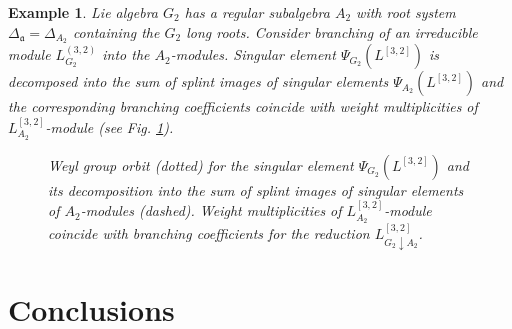 \documentclass[12pt]{article}
\newtheorem{example}{Example}[section]
\begin{document}
\vspace{10mm}
\begin{example}
   Lie algebra $G_{2}$ has a regular subalgebra $A_{2}$ with root system $\Delta_{\mathfrak{a}}=\Delta_{A_{2}}$ containing the $G_{2}$ long roots. Consider branching of an irreducible module $L_{G_{2}}^{(3,2)}$ into the $A_{2}$-modules. Singular element $\Psi_{G_{2}}(L^{[3,2]})$ is decomposed into the sum of splint images of singular elements $\Psi_{A_{2}}(L^{[3,2]})$ and the corresponding branching coefficients coincide with weight multiplicities of $L^{[3,2]}_{A_{2}}$-module (see Fig. \ref{fig:g2_splint}).


  \begin{figure}[h!bt]
  \noindent{}

  \caption{Weyl group orbit (dotted) for the singular element $\Psi_{G_{2}}(L^{[3,2]})$ and its decomposition into the sum of splint images of singular elements of $A_{2}$-modules (dashed). Weight multiplicities of $L^{[3,2]}_{A_{2}}$-module coincide with branching coefficients for the reduction $L^{[3,2]}_{G_{2}\downarrow A_{2}}$.}


 \label{fig:g2_splint}
\end{figure}

\end{example}

\section{Conclusions}
\end{document}
